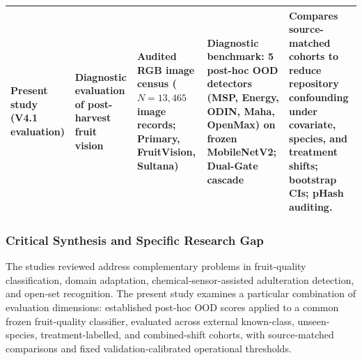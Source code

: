 \begin{table}[!t]
\begin{tabular}{>{\raggedright\arraybackslash}p{2.4cm} >{\raggedright\arraybackslash}p{2.3cm} >{\raggedright\arraybackslash}p{2.6cm} >{\raggedright\arraybackslash}p{3.5cm} >{\raggedright\arraybackslash}p{4.2cm}}
\addlinespace[3pt]
\textbf{Present study} \newline (V4.1 evaluation) & Diagnostic evaluation of post-harvest fruit vision & Audited RGB image census \newline ($N=13,465$ image records; Primary, FruitVision, Sultana) & Diagnostic benchmark: 5 post-hoc OOD detectors (MSP, Energy, ODIN, Maha, OpenMax) on frozen MobileNetV2; Dual-Gate cascade & Compares source-matched cohorts to reduce repository confounding under covariate, species, and treatment shifts; bootstrap CIs; pHash auditing. \\
\bottomrule
\end{tabular}
\end{table}

\subsubsection{Critical Synthesis and Specific Research Gap}
\label{sec:research_gap}

The studies reviewed address complementary problems in fruit-quality classification, domain adaptation, chemical-sensor-assisted adulteration detection, and open-set recognition. The present study examines a particular combination of evaluation dimensions: established post-hoc OOD scores applied to a common frozen fruit-quality classifier, evaluated across external known-class, unseen-species, treatment-labelled, and combined-shift cohorts, with source-matched comparisons and fixed validation-calibrated operational thresholds.

